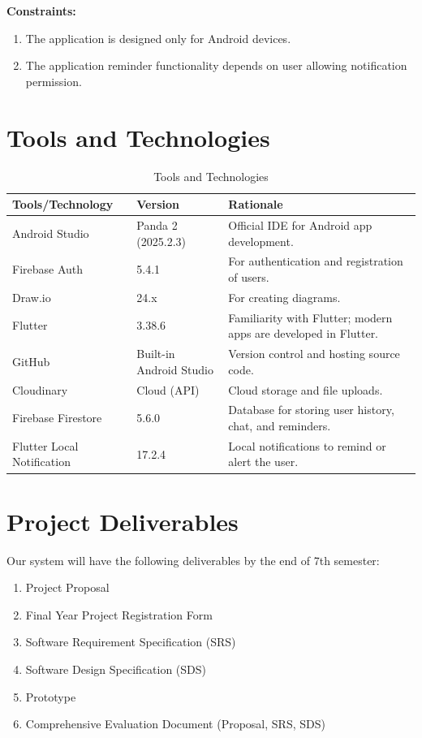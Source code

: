 \textbf{Constraints:}
\begin{enumerate}
    \item The application is designed only for Android devices.
    \item The application reminder functionality depends on user allowing notification permission.
\end{enumerate}

\section{Tools and Technologies}
\label{sec:tools}

\begin{table}[H]
\centering
\caption{Tools and Technologies}
\label{tab:tools}
\begin{tabularx}{\textwidth}{|l|l|X|}
\hline
\textbf{Tools/Technology} & \textbf{Version} & \textbf{Rationale} \\ \hline
Android Studio & Panda 2 (2025.2.3) & Official IDE for Android app development. \\ \hline
Firebase Auth & 5.4.1 & For authentication and registration of users. \\ \hline
Draw.io & 24.x & For creating diagrams. \\ \hline
Flutter & 3.38.6 & Familiarity with Flutter; modern apps are developed in Flutter. \\ \hline
GitHub & Built-in Android Studio & Version control and hosting source code. \\ \hline
Cloudinary & Cloud (API) & Cloud storage and file uploads. \\ \hline
Firebase Firestore & 5.6.0 & Database for storing user history, chat, and reminders. \\ \hline
Flutter Local Notification & 17.2.4 & Local notifications to remind or alert the user. \\ \hline
\end{tabularx}
\end{table}

\section{Project Deliverables}
\label{sec:deliverables}

Our system will have the following deliverables by the end of 7th semester:
\begin{enumerate}
    \item Project Proposal
    \item Final Year Project Registration Form
    \item Software Requirement Specification (SRS)
    \item Software Design Specification (SDS)
    \item Prototype
    \item Comprehensive Evaluation Document (Proposal, SRS, SDS)
\end{enumerate}

